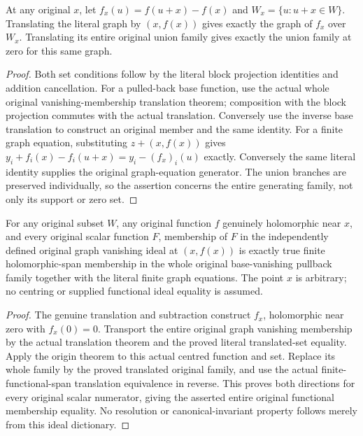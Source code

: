 \begin{theorem}
\label{hir:actual-graph-functional-recentering}
\leanok
At any original $x$, let $f_x(u)=f(u+x)-f(x)$ and
$W_x=\{u:u+x\in W\}$. Translating the literal graph by $(x,f(x))$
gives exactly the graph of $f_x$ over $W_x$. Translating its entire original
union family gives exactly the union family at zero for this same graph.
\end{theorem}
\begin{proof}
Both set conditions follow by the literal block projection identities and
addition cancellation. For a pulled-back base function, use the actual
whole original vanishing-membership translation theorem; composition with
the block projection commutes with the actual translation. Conversely use
the inverse base translation to construct an original member and the same
identity. For a finite graph equation, substituting $z+(x,f(x))$ gives
$y_i+f_i(x)-f_i(u+x)=y_i-(f_x)_i(u)$ exactly. Conversely the same literal
identity supplies the original graph-equation generator. The union branches
are preserved individually, so the assertion concerns the entire generating
family, not only its support or zero set.
\end{proof}

\begin{theorem}
\label{hir:actual-graph-functional-ideal-every-point}
\leanok
For any original subset $W$, any original function $f$ genuinely holomorphic
near $x$, and every original scalar function $F$, membership of $F$ in the
independently defined original graph vanishing ideal at $(x,f(x))$ is
exactly true finite holomorphic-span membership in the whole original
base-vanishing pullback family together with the literal finite graph
equations. The point $x$ is arbitrary; no centring or supplied functional
ideal equality is assumed.
\end{theorem}
\begin{proof}
The genuine translation and subtraction construct $f_x$, holomorphic near
zero with $f_x(0)=0$. Transport the entire original graph vanishing membership
by the actual translation theorem and the proved literal translated-set
equality. Apply the origin theorem to this actual centred function and set.
Replace its whole family by the proved translated original family, and use
the actual finite-functional-span translation equivalence in reverse.
This proves both directions for every original scalar numerator, giving
the asserted entire original functional membership equality. No resolution
or canonical-invariant property follows merely from this ideal dictionary.
\end{proof}
